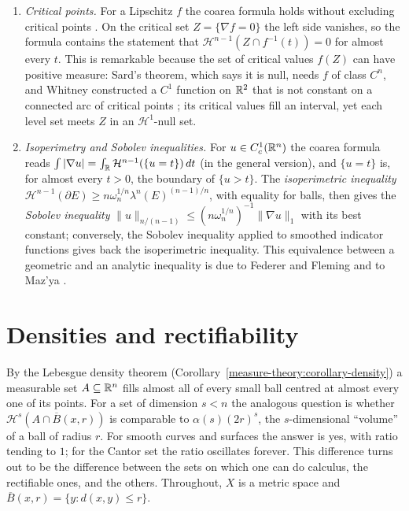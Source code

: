 \begin{remark}\label{measure-theory:remark-coarea}
\begin{enumerate}
\item \emph{Critical points.} For a Lipschitz $f$ the coarea formula holds without excluding critical points \cite[Section 3.4]{evans-gariepy}. On the critical set $Z = \{\nabla f = 0\}$ the left side
vanishes, so the formula contains the statement that $\mathcal{H}^{n-1}(Z \cap f^{-1}(t)) = 0$ for almost every $t$. This is remarkable because the set of critical values $f(Z)$ can have positive
measure: Sard's theorem, which says it is null, needs $f$ of class $C^n$, and Whitney constructed a $C^1$ function on $\mathbb{R}^2$ that is not constant on a connected arc of critical points
\cite{whitney-1935}; its critical values fill an interval, yet each level set meets $Z$ in an $\mathcal{H}^1$-null set.
\item \emph{Isoperimetry and Sobolev inequalities.} For $u \in C^1_c(\mathbb{R}^n)$ the coarea formula reads $\int|\nabla u| = \int_{\mathbb{R}}\mathcal{H}^{n-1}(\{u = t\})\,dt$ (in the general version), and
$\{u = t\}$ is, for almost every $t > 0$, the boundary of $\{u > t\}$. The \emph{isoperimetric inequality} $\mathcal{H}^{n-1}(\partial E) \geq n\omega_n^{1/n}\lambda^n(E)^{(n-1)/n}$, with equality for
balls, then gives the \emph{Sobolev inequality} $\|u\|_{n/(n-1)} \leq (n\omega_n^{1/n})^{-1}\|\nabla u\|_1$ with its best constant; conversely, the Sobolev inequality applied to smoothed indicator functions
gives back the isoperimetric inequality. This equivalence between a geometric and an analytic inequality is due to Federer and Fleming and to Maz'ya \cite{federer-fleming-1960}.
\end{enumerate}
\end{remark}

\section{Densities and rectifiability}\label{measure-theory:section-densities}

By the Lebesgue density theorem (Corollary~\ref{measure-theory:corollary-density}) a measurable set $A \subseteq \mathbb{R}^n$ fills almost all of every small ball centred at almost every one of its
points. For a set of dimension $s < n$ the analogous question is whether $\mathcal{H}^s(A \cap \overline{B}(x, r))$ is comparable to $\alpha(s)(2r)^s$, the $s$-dimensional ``volume'' of a ball of radius
$r$. For smooth curves and surfaces the answer is yes, with ratio tending to $1$; for the Cantor set the ratio oscillates forever. This difference turns out to be the difference between the sets on which
one can do calculus, the rectifiable ones, and the others. Throughout, $X$ is a metric space and $\overline{B}(x, r) = \{y : d(x, y) \leq r\}$.

